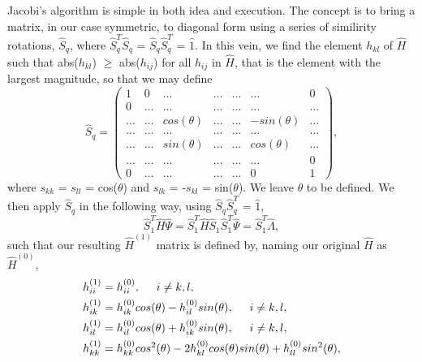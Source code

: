 \documentclass[11pt,a4paper]{article}
\begin{document}
{Jacobi's algorithm is simple in both idea and execution. The concept is to bring a matrix, in our case symmetric, to diagonal form using a series of similirity rotations, $\hat{S}_q$, where $\hat{S}_q^T\hat{S}_q$ = $\hat{S}_q\hat{S}_q^T$ = $\hat{1}$. In this vein, we find the element $h_{kl}$ of $\hat{H}$ such that abs($h_{kl}$) $\geq$ abs($h_{ij}$) for all $h_{ij}$ in $\hat{H}$, that is the element with the largest magnitude, so that we may define 
\begin{equation}
\hat{S}_q = \left(\begin{array}{ccccccc}
			1 & 0 & \dots & \dots & \dots & \dots & 0 \\
			0 & \dots & \dots & \dots & \dots & \dots & \dots \\
			\dots & \dots & cos(\theta) & \dots & \dots & -sin(\theta) & \dots \\
			\dots & \dots & \dots & \dots & \dots & \dots & \dots \\
			\dots & \dots & sin(\theta) & \dots & \dots & cos(\theta) & \dots \\
			\dots & \dots & \dots & \dots & \dots & \dots & 0 \\
			0 & \dots & \dots & \dots & \dots & 0 & 1 \end{array}\right),
\end{equation}
where $s_{kk}$ = $s_{ll}$ = cos($\theta$) and $s_{lk}$ = -$s_{kl}$ = sin($\theta$). We leave $\theta$ to be defined. We then apply $\hat{S}_q$ in the following way, using $\hat{S}_q\hat{S}_q^T$ = $\hat{1}$,
\begin{equation}
\hat{S}_1^T\hat{H}\hat{\Psi} = \hat{S}_1^T\hat{H}\hat{S}_1\hat{S}_1^T\hat{\Psi} = \hat{S}_1^T\hat{\Lambda},
\end{equation}
such that our resulting $\hat{H}^{(1)}$ matrix is defined by, naming our original $\hat{H}$ as $\hat{H}^{(0)}$,
\begin{align}
h_{ii}^{(1)} &= h_{ii}^{(0)}, \hspace{0.5 cm} i \neq k, l, \\
h_{ik}^{(1)} &= h_{ik}^{(0)}cos(\theta) - h_{il}^{(0)}sin(\theta), \hspace{0.5 cm} i \neq k,l, \\
h_{il}^{(1)} &= h_{il}^{(0)}cos(\theta) + h_{ik}^{(0)}sin(\theta), \hspace{0.5 cm} i \neq k,l ,\\
h_{kk}^{(1)} &= h_{kk}^{(0)}cos^2(\theta) - 2h_{kl}^{(0)}cos(\theta)sin(\theta) + h_{ll}^{(0)}sin^2(\theta), \\

\end{align}}
\end{document}
